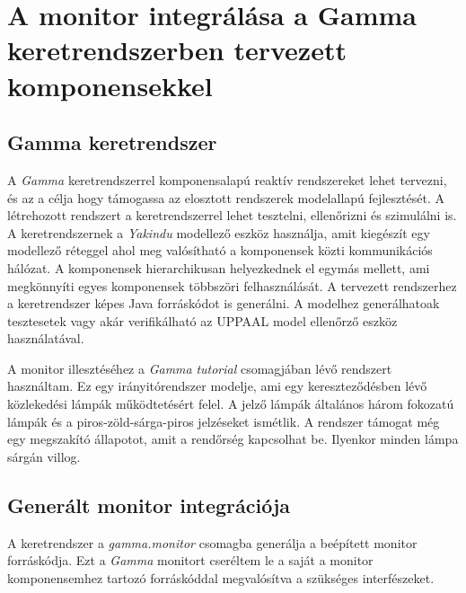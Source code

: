 \chapter{A monitor integrálása a Gamma keretrendszerben tervezett komponensekkel}

\section{Gamma keretrendszer}

A \textit{Gamma} keretrendszerrel komponensalapú reaktív rendszereket lehet tervezni, és az a célja hogy támogassa az elosztott rendszerek modelallapú fejlesztését.
A létrehozott rendszert a keretrendszerrel lehet tesztelni, ellenőrizni és szimulálni is.
A keretrendszernek a \textit{Yakindu} modellező eszköz használja, amit kiegészít egy modellező réteggel ahol meg valósítható a komponensek közti kommunikációs hálózat.
A komponensek hierarchikusan helyezkednek el egymás mellett, ami megkönnyíti egyes komponensek többszöri felhasználását.
A tervezett rendszerhez a keretrendszer képes Java forráskódot is generálni.
A modelhez generálhatoak tesztesetek vagy akár verifikálható az UPPAAL model ellenőrző eszköz használatával.

A monitor illesztéséhez a \textit{Gamma} \textit{tutorial} csomagjában lévő rendszert használtam.
Ez egy irányitórendszer modelje, ami egy kereszteződésben lévő közlekedési lámpák működtetésért felel.
A jelző lámpák általános három fokozatú lámpák és a piros-zöld-sárga-piros jelzéseket ismétlik.
A rendszer támogat még egy megszakító állapotot, amit a rendőrség kapcsolhat be.
Ilyenkor minden lámpa sárgán villog.

\clearpage\section{Generált monitor integrációja}

A keretrendszer a \textit{gamma.monitor} csomagba generálja a beépített monitor forráskódja.
Ezt a \textit{Gamma} monitort cseréltem le a saját a monitor komponensemhez tartozó forráskóddal megvalósítva a szükséges interfészeket.

